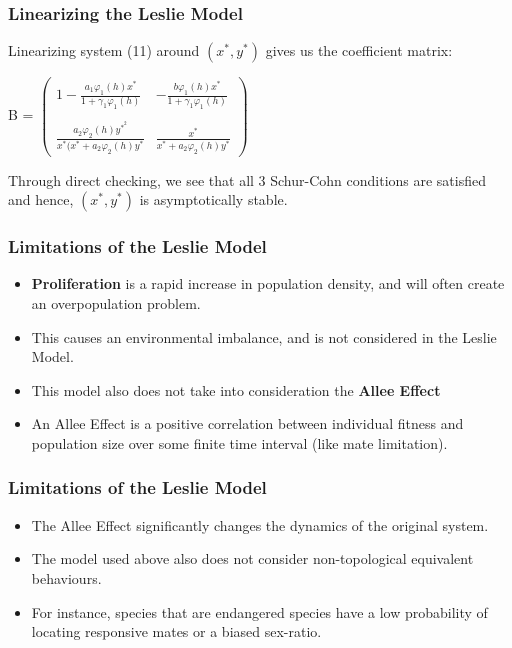 \documentclass[xcolor={svgnames},hyperref={colorlinks,allcolors=Blue}]{beamer}
\begin{document}
\begin{frame}
\frametitle{Linearizing the Leslie Model}

Linearizing system (11) around $(x^*,y^*)$ gives us the coefficient matrix: 

\begin{center}
\pause
    B = $\begin{pmatrix}
    1 - \frac{a_1\varphi_1(h)x^*}{1+\gamma_1\varphi_1(h)} & -\frac{b\varphi_1(h)x^*}{1+\gamma_1\varphi_1(h)} \\~\\
    \frac{a_2\varphi_2(h)y^*^2}{x^*(x^*+a_2\varphi_2(h)y^*} & \frac{x^*}{x^* + a_2\varphi_2(h)y^*}
    \end{pmatrix}$

\end{center}

\pause
Through direct checking, we see that all 3 Schur-Cohn conditions are satisfied and hence, $(x^*,y^*)$ is asymptotically stable.
\end{frame}

\begin{frame}
\frametitle{Limitations of the Leslie Model}
	\begin{itemize}
	
	\item \textbf{Proliferation} is a rapid increase in population density, and will often create an overpopulation problem. 		\pause
	\item This causes an environmental imbalance, and is not considered in the Leslie Model. \pause
	\item This model also does not take into consideration the \textbf{Allee Effect} \pause
	\item An Allee Effect is a positive correlation between individual fitness and population size over some finite time interval (like mate limitation). 
	\end{itemize}


\end{frame}


\begin{frame}
\frametitle{Limitations of the Leslie Model}
	\begin{itemize}
	\item The Allee Effect significantly changes the dynamics of the original system. \pause
	\item The model used above also does not consider non-topological equivalent behaviours.  \pause 
	\item For instance, species that are endangered species have a low probability of locating responsive mates or a 			biased sex-ratio. 
	\end{itemize}
	
\end{frame}
\end{document}
